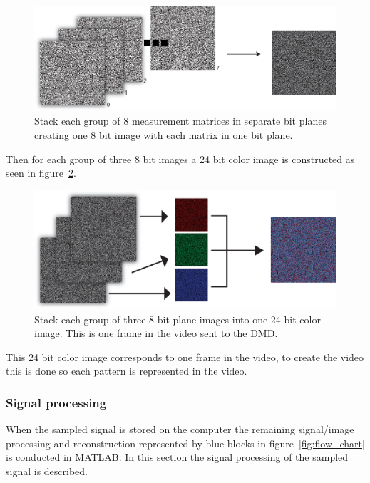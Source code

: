 \begin{figure}[H]
\includegraphics[width = 1\linewidth]{gfx/DMD_12.eps}
\caption{Stack each group of 8 measurement matrices in separate  bit planes creating one 8 bit image with each matrix in one bit plane.}
	\label{fig:8_to_1_8}
\end{figure}

Then for each group of three 8 bit images a 24 bit color image is constructed as seen in figure~\ref{fig:3_8_to_1_3}. 

\begin{figure}[H]
\includegraphics[width = 1\linewidth]{gfx/DMD_2.eps}
\caption{Stack each group of three 8 bit plane images into one 24 bit color image. This is one frame in the video sent to the DMD.}
	\label{fig:3_8_to_1_3}
\end{figure}

This 24 bit color image corresponds to one frame in the video, to create the video this is done so each pattern is represented in the video.



\subsubsection{Signal processing}
\label{sec:signal_process}  
When the sampled signal is stored on the computer the remaining signal/image processing and reconstruction represented by blue blocks in figure~\ref{fig:flow_chart} is conducted in MATLAB. In this section the signal processing of the sampled signal is described.\\[0.1in]

